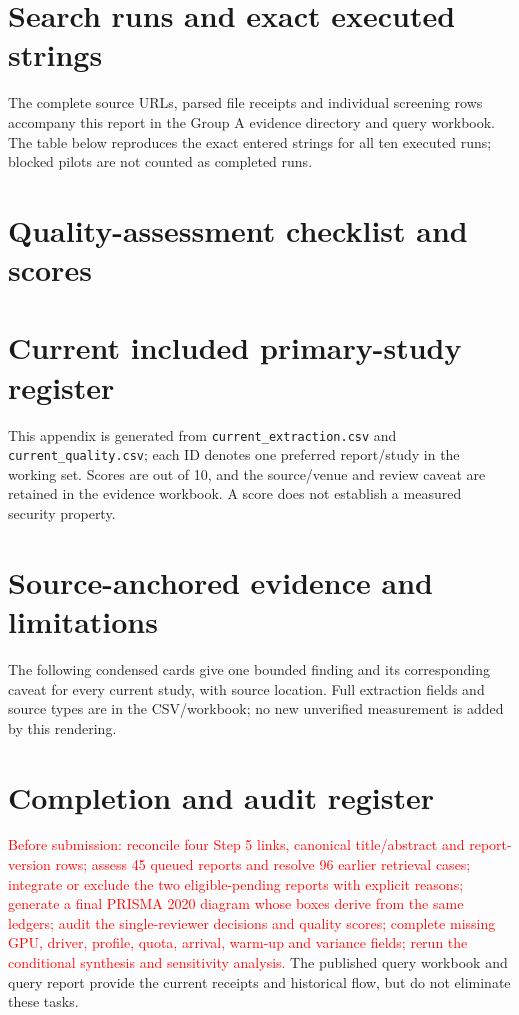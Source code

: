 \documentclass[12pt,a4paper]{article}
\newcommand{\red}[1]{\textcolor{red}{#1}}
\begin{document}


\appendix
\section{Search runs and exact executed strings}
The complete source URLs, parsed file receipts and individual screening rows accompany this report in the Group A evidence directory and query workbook. The table below reproduces the exact entered strings for all ten executed runs; blocked pilots are not counted as completed runs.

\section{Quality-assessment checklist and scores}

\section{Current included primary-study register}
This appendix is generated from \texttt{current\_extraction.csv} and \texttt{current\_quality.csv}; each ID denotes one preferred report/study in the working set. Scores are out of 10, and the source/venue and review caveat are retained in the evidence workbook. A score does not establish a measured security property.


\section{Source-anchored evidence and limitations}
The following condensed cards give one bounded finding and its corresponding caveat for every current study, with source location. Full extraction fields and source types are in the CSV/workbook; no new unverified measurement is added by this rendering.


\section{Completion and audit register}
\red{Before submission: reconcile four Step 5 links, canonical title/abstract and report-version rows; assess 45 queued reports and resolve 96 earlier retrieval cases; integrate or exclude the two eligible-pending reports with explicit reasons; generate a final PRISMA 2020 diagram whose boxes derive from the same ledgers; audit the single-reviewer decisions and quality scores; complete missing GPU, driver, profile, quota, arrival, warm-up and variance fields; rerun the conditional synthesis and sensitivity analysis.} The published query workbook and query report provide the current receipts and historical flow, but do not eliminate these tasks.
\end{document}
